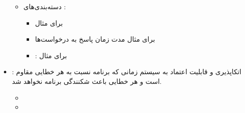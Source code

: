 \begin{itemize}
\begin{itemize}
        \item دسته‌بندی‌های :
        \begin{itemize}
            \item {} برای مثال 
            \item {} برای مثال مدت زمان پاسخ به درخواست‌ها
            \item {}: برای مثال 
        \end{itemize}
    \end{itemize}
    \item {}: اتکاپذیری و قابلیت اعتماد به سیستم زمانی که برنامه
    نسبت به هر خطایی مقاوم است و هر خطایی باعث شکنندگی برنامه نخواهد شد.
    \begin{itemize}
        \item {}
        \item {}
    \end{itemize}
\end{itemize}